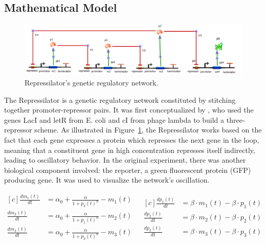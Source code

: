 \documentclass[12pt]{article}
\begin{document}
\subsection{Mathematical Model}

    \begin{figure}[h]
        \centering
        \includegraphics[scale = 0.7]{repressilator_model.png}
        \caption{Repressilator's genetic regulatory network.}
        \label{fig:repressilator_model}
    \end{figure}
    
    The Repressilator is a genetic regulatory network constituted by stitching together promoter-repressor pairs. It was first conceptualized by \cite{Elowitz2000}, who used the genes LacI and letR from E. coli and cI from phage lambda to build a three-repressor scheme. As illustrated in Figure~\ref{fig:repressilator_model}, the Repressilator works based on the fact that each gene expresses a protein which represses the next gene in the loop, meaning that a constituent gene in high concentration represses itself indirectly, leading to oscillatory behavior. In the original experiment, there was another biological component involved: the reporter, a green fluorescent protein (GFP) producing gene. It was used to visualize the network's oscillation.
    
    \begin{equation}
    \begin{aligned}[c]
        \frac{dm_{1}(t)}{dt} & = \alpha_{0} + \frac{\alpha}{1 + p_{3}(t)^{n}} - m_{1}(t) & \\
        \frac{dm_{2}(t)}{dt} & = \alpha_{0} + \frac{\alpha}{1 + p_{1}(t)^{n}} - m_{2}(t) & \\
        \frac{dm_{3}(t)}{dt} & = \alpha_{0} + \frac{\alpha}{1 + p_{2}(t)^{n}} - m_{3}(t) &
    \end{aligned}
    \begin{aligned}[c]
        \frac{dp_{1}(t)}{dt} & = \beta \cdot m_{1}(t) - \beta \cdot p_{1}(t) \\
        \frac{dp_{2}(t)}{dt} & = \beta \cdot m_{2}(t) - \beta \cdot p_{2}(t) \\
        \frac{dp_{3}(t)}{dt} & = \beta \cdot m_{3}(t) - \beta \cdot p_{3}(t)
    \end{aligned}
    \end{equation}
\end{document}
